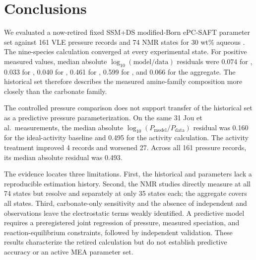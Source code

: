 \section{Conclusions}\label{sec:conclusion}
We evaluated a now-retired fixed SSM+DS modified-Born ePC-SAFT parameter set against 161 VLE pressure records and 74 NMR states for 30 wt\% aqueous \MEA.  The nine-species calculation converged at every experimental state.  For positive measured values, median absolute \(\log_{10}(\mathrm{model}/\mathrm{data})\) residuals were 0.074 for \MEA, 0.033 for \MEAH, 0.040 for \MEACOO, 0.461 for \HCOthree, 0.599 for \COthree, and 0.066 for the  aggregate.  The historical set therefore describes the measured amine-family composition more closely than the carbonate family.

The controlled pressure comparison does not support transfer of the historical set as a predictive pressure parameterization.  On the same 31 Jou et al.\ measurements, the median absolute \(\log_{10}(P_{\mathrm{model}}/P_{\mathrm{data}})\) residual was 0.160 for the ideal-activity baseline and 0.495 for the activity calculation.  The activity treatment improved 4 records and worsened 27.  Across all 161 pressure records, its median absolute residual was 0.493.

The evidence locates three limitations.  First, the historical \MEAH and \MEACOO parameters lack a reproducible estimation history.  Second, the NMR studies directly measure \MEACOO at all 74 states but resolve \MEA and \MEAH separately at only 35 states each; the  aggregate covers all states.  Third, carbonate-only sensitivity and the absence of independent \HthreeO and \Hydroxide observations leave the electrostatic terms weakly identified.  A predictive model requires a preregistered joint regression of pressure, measured speciation, and reaction-equilibrium constraints, followed by independent validation.  These results characterize the retired calculation but do not establish predictive accuracy or an active MEA parameter set.

